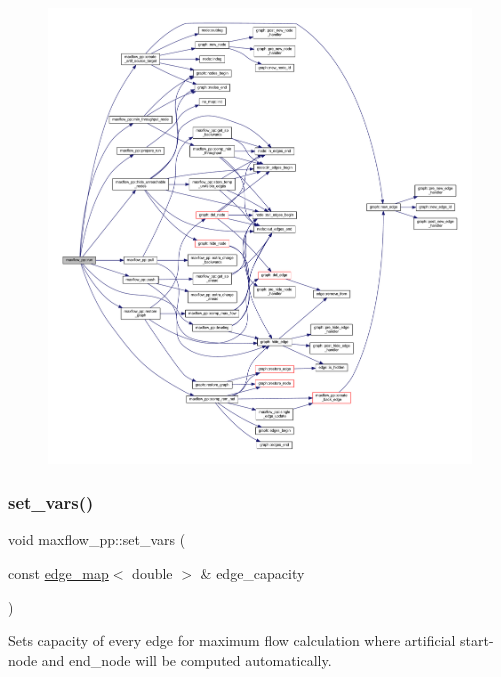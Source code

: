 \begin{figure}[H]
\begin{center}
\leavevmode
\includegraphics[width=350pt]{classmaxflow__pp_a07c7cb1ae5db23d87cf49ce7769b2814_cgraph}
\end{center}
\end{figure}
\mbox{\label{classmaxflow__pp_ac77f4c613efe7857e053f9bfb103dc3e}} 
\subsubsection{\texorpdfstring{set\+\_\+vars()}{set\_vars()}\hspace{0.1cm}{\footnotesize\ttfamily [1/2]}}
{\footnotesize\ttfamily void maxflow\+\_\+pp\+::set\+\_\+vars (\begin{DoxyParamCaption}\item[{const \mbox{\hyperlink{classedge__map}{edge\+\_\+map}}$<$ double $>$ \&}]{edge\+\_\+capacity }\end{DoxyParamCaption})}

Sets capacity of every edge for maximum flow calculation where artificial start-\/node and end\+\_\+node will be computed automatically.


